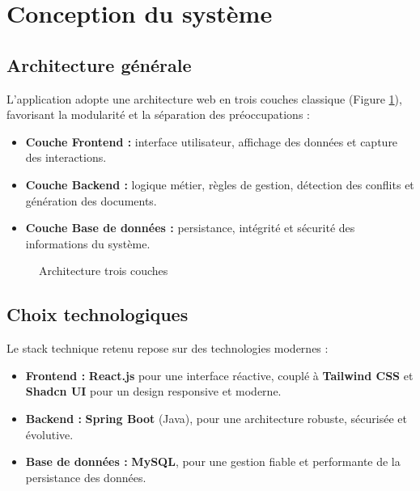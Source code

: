 \documentclass[12pt,a4paper]{article}
\begin{document}
\section{Conception du système}
\label{sec:conception}

\subsection{Architecture générale}
\label{subsec:architecture}

L'application adopte une architecture web en trois couches classique
(Figure \ref{fig:architecture}), favorisant la modularité et la séparation des
préoccupations :

\begin{itemize}[label=\textcolor{primary}{\textbullet}]
    \item \textbf{Couche Frontend :} interface utilisateur, affichage des données
          et capture des interactions.
    \item \textbf{Couche Backend :} logique métier, règles de gestion, détection
          des conflits et génération des documents.
    \item \textbf{Couche Base de données :} persistance, intégrité et sécurité
          des informations du système.
\end{itemize}

\begin{figure}[H]
    \centering
    \caption{Architecture trois couches}
    \label{fig:architecture}
\end{figure}

\subsection{Choix technologiques}
\label{subsec:stack}

Le stack technique retenu repose sur des technologies modernes :

\begin{itemize}[label=\textcolor{primary}{\textbullet}]
    \item \textbf{Frontend :} \textbf{React.js} pour une interface réactive,
          couplé à \textbf{Tailwind CSS} et \textbf{Shadcn UI} pour un design responsive et moderne.
    \item \textbf{Backend :} \textbf{Spring Boot} (Java), pour une architecture
          robuste, sécurisée et évolutive.
    \item \textbf{Base de données :} \textbf{MySQL}, pour une gestion fiable
          et performante de la persistance des données.
\end{itemize}
\end{document}
